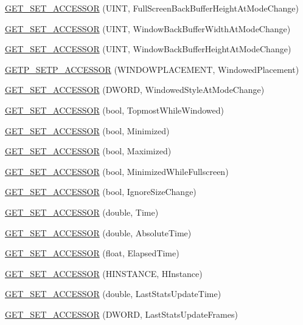 \begin{DoxyCompactItemize}
\item 
\hyperlink{class_d_x_u_t_state_ae5f41b2f4bf62828ee9225bccea71f00}{GET\_\-SET\_\-ACCESSOR} (UINT, FullScreenBackBufferHeightAtModeChange)
\item 
\hyperlink{class_d_x_u_t_state_aa9b801ff918be9e94b0c1b0c495d9988}{GET\_\-SET\_\-ACCESSOR} (UINT, WindowBackBufferWidthAtModeChange)
\item 
\hyperlink{class_d_x_u_t_state_aa376410a98f1d763d13ab8cf678ca4e3}{GET\_\-SET\_\-ACCESSOR} (UINT, WindowBackBufferHeightAtModeChange)
\item 
\hyperlink{class_d_x_u_t_state_a5536ff55b878141213e29c0a475fb273}{GETP\_\-SETP\_\-ACCESSOR} (WINDOWPLACEMENT, WindowedPlacement)
\item 
\hyperlink{class_d_x_u_t_state_a5b16a6c1961ef412cff6e67cdb6018e5}{GET\_\-SET\_\-ACCESSOR} (DWORD, WindowedStyleAtModeChange)
\item 
\hyperlink{class_d_x_u_t_state_ad26450006ff4e314b24aca74ea91bb26}{GET\_\-SET\_\-ACCESSOR} (bool, TopmostWhileWindowed)
\item 
\hyperlink{class_d_x_u_t_state_ac4601af8960b515e304bc4f0bb28dbe6}{GET\_\-SET\_\-ACCESSOR} (bool, Minimized)
\item 
\hyperlink{class_d_x_u_t_state_a500e3875a183dcaa6c0cb0a2cdc74cc1}{GET\_\-SET\_\-ACCESSOR} (bool, Maximized)
\item 
\hyperlink{class_d_x_u_t_state_a07cafa9805d4a519c5d8f3b3dd174325}{GET\_\-SET\_\-ACCESSOR} (bool, MinimizedWhileFullscreen)
\item 
\hyperlink{class_d_x_u_t_state_ae22f397c5dcea02a491307d4a8627673}{GET\_\-SET\_\-ACCESSOR} (bool, IgnoreSizeChange)
\item 
\hyperlink{class_d_x_u_t_state_a9928c8caea52f9375d6c9ec2bf49264d}{GET\_\-SET\_\-ACCESSOR} (double, Time)
\item 
\hyperlink{class_d_x_u_t_state_a63afe2875d0d29822bdd8abdbc2c5bcb}{GET\_\-SET\_\-ACCESSOR} (double, AbsoluteTime)
\item 
\hyperlink{class_d_x_u_t_state_a648316ed44cdbdbe6b7e4e7edb4baf84}{GET\_\-SET\_\-ACCESSOR} (float, ElapsedTime)
\item 
\hyperlink{class_d_x_u_t_state_a120cbee424cd8d4027ccb673a54dac45}{GET\_\-SET\_\-ACCESSOR} (HINSTANCE, HInstance)
\item 
\hyperlink{class_d_x_u_t_state_abaf158a9b3da0ca285351bc1734ce0bc}{GET\_\-SET\_\-ACCESSOR} (double, LastStatsUpdateTime)
\item 
\hyperlink{class_d_x_u_t_state_ac41d64d5d6c5e2e4581d7691de699813}{GET\_\-SET\_\-ACCESSOR} (DWORD, LastStatsUpdateFrames)

\end{DoxyCompactItemize}
